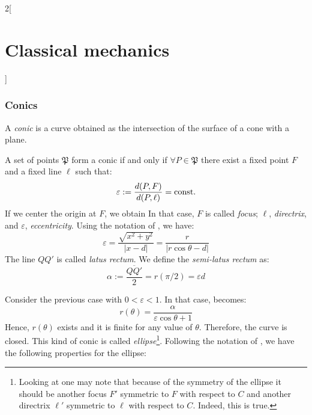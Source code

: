 \documentclass[../../../main_physics.tex]{subfiles}
\begin{document}
\begin{multicols}{2}[\section{Classical mechanics}]
  \subsubsection{Conics}
  \begin{definition}
    A \emph{conic} is a curve obtained as the intersection of the surface of a cone with a plane.
  \end{definition}
  \begin{proposition}
    A set of points $\mathfrak{P}$ form a conic if and only if $\forall P\in\mathfrak{P}$ there exist a fixed point $F$ and a fixed line $\ell$ such that: $$\varepsilon:=\frac{d(P,F)}{d(P,\ell)}=\text{const.}$$ If we center the origin at $F$, we obtain In that case, $F$ is called \emph{focus}; $\ell$, \emph{directrix}, and $\varepsilon$, \emph{eccentricity}. Using the notation of , we have:
    \begin{equation}\label{CM_eq-conics}
      \varepsilon=\frac{\sqrt{x^2+y^2}}{|x-d|}=\frac{r}{|r\cos\theta -d|}
    \end{equation}
    The line $QQ'$ is called \emph{latus rectum}. We define the \emph{semi-latus rectum} as: $$\alpha:=\frac{\overline{QQ'}}{2}=r(\pi/2)=\varepsilon d$$
    \begin{center}
      \begin{minipage}{\linewidth}
        \centering
        
        \label{CM_conics}
      \end{minipage}
    \end{center}
  \end{proposition}
  \begin{definition}
    Consider the previous case with $0<\varepsilon<1$. In that case,  becomes:
    \begin{equation}\label{CM_eq-ellipse}
      r(\theta)=\frac{\alpha}{\varepsilon\cos\theta+1}
    \end{equation}
    Hence, $r(\theta)$ exists and it is finite for any value of $\theta$. Therefore, the curve is closed. This kind of conic is called \emph{ellipse}\footnote{Looking at  one may note that because of the symmetry of the ellipse it should be another focus $F'$ symmetric to $F$ with respect to $C$ and another directrix $\ell'$ symmetric to $\ell$ with respect to $C$. Indeed, this is true.}.
    Following the notation of , we have the following properties for the ellipse:

\end{definition}
\end{multicols}
\end{document}
